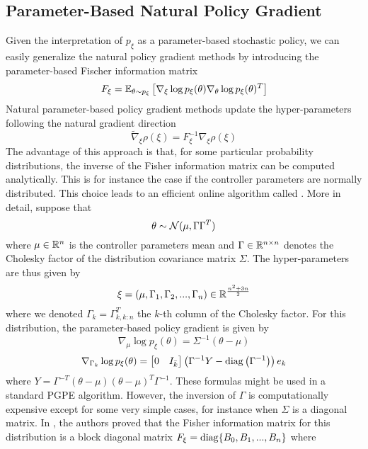 \subsection{Parameter-Based Natural Policy Gradient}
Given the interpretation of $p_\xi$ as a parameter-based stochastic policy, we can easily generalize the natural policy gradient methods by introducing the parameter-based Fischer information matrix
\begin{equation}
	F_\xi = \E[\theta\sim p_\xi]{\nabla_\xi\log p_\xi(\theta) \nabla_\theta\log p_\xi(\theta)^T}
\end{equation}
Natural parameter-based policy gradient methods update the hyper-parameters following the natural gradient direction 
\begin{equation}
	\widetilde{\nabla}_\xi \rho(\xi) = F_\xi^{-1} \nabla_\xi \rho(\xi)
\end{equation}
The advantage of this approach is that, for some particular probability distributions, the inverse of the Fisher information matrix can be computed analytically. This is for instance the case if the controller parameters are normally distributed. This choice leads to an efficient online algorithm called  \cite{miyamae2010natural}. More in detail, suppose that
\begin{equation*}
	\theta \sim \calN(\mu, \Gamma \Gamma^T)
\end{equation*} 
where $\mu\in\R^n$ is the controller parameters mean and $\Gamma \in \R^{n\times n}$ denotes the Cholesky factor of the distribution covariance matrix $\Sigma$. The hyper-parameters are thus given by 
\begin{equation*}
	\xi = (\mu, \Gamma_1, \Gamma_2, ... , \Gamma_n) \in \R^\frac{n^2 + 3n}{2}
\end{equation*}
where we denoted $\Gamma_k = \Gamma_{k,k:n}^T$ the $k$-th column of the Cholesky factor. For this distribution, the parameter-based policy gradient is given by
\begin{equation}
	\nabla_\mu \log p_\xi(\theta) = \Sigma^{-1} (\theta - \mu)
\end{equation}
\begin{equation}
	\nabla_{\Gamma_k} \log p_\xi(\theta) = \begin{bmatrix} 0 & I_{\bar{k}} \end{bmatrix} \left(\Gamma^{-1} Y - \diag\left(\Gamma^{-1}\right)\right) e_k
\end{equation}
where $Y = \Gamma^{-T} (\theta - \mu) (\theta - \mu)^T \Gamma^{-1}$. These formulas might be used in a standard \gls{PGPE} algorithm. However, the inversion of $\Gamma$ is computationally expensive except for some very simple cases, for instance when $\Sigma$ is a diagonal matrix. In \cite{sun2009efficient}, the authors proved that the Fisher information matrix for this distribution is a block diagonal matrix $F_\xi = \diag\{B_0, B_1, ..., B_n\}$ where
